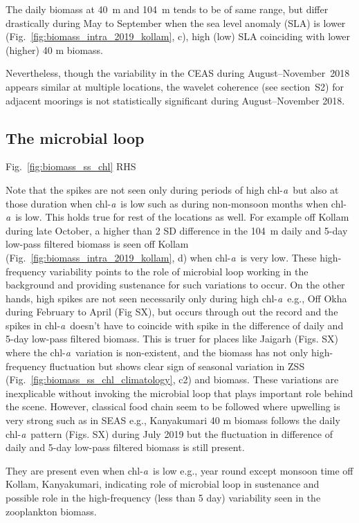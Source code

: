 \documentclass[authoryear,review,11pt]{elsarticle}
\newcommand{\chla}{chl-{\emph{a}}}
\begin{document}
The daily biomass at 40~m and 104~m tends to be of same range, but differ drastically during May to September when the sea level anomaly (SLA) is lower (Fig.~\ref{fig:biomass_intra_2019_kollam}, c),  high (low) SLA coinciding with lower (higher) 40 m biomass.   

 Nevertheless, though the variability in the CEAS during August--November~2018 appears similar at multiple locations, the wavelet coherence (see section~S2) for adjacent moorings is not statistically significant during August--November 2018.


\subsection{The microbial loop}
\label{sec:discuss.mloop}


Fig.~\ref{fig:biomass_ss_chl} RHS

Note that the spikes are not seen only during periods of high \chla\ but also at those duration when \chla\ is low such as during non-monsoon months when \chla\ is low. This holds true for rest of the locations as well. For example off Kollam during late October, a higher than 2 SD difference in the 104~m daily and 5-day low-pass filtered biomass is seen off Kollam (Fig.~\ref{fig:biomass_intra_2019_kollam}, d) when \chla\ is very low. These high-frequency variability points to the role of microbial loop working in the background and providing sustenance for such variations to occur. On the other hands, high spikes are not seen necessarily only during high \chla\ e.g., Off Okha during February to April (Fig SX), but occurs through out the record and the spikes in \chla\ doesn't have to coincide with spike in the difference of daily and 5-day low-pass filtered biomass. This is truer for places like Jaigarh (Figs. SX) where the \chla\ variation is non-existent, and the biomass has not only high-frequency fluctuation but shows clear sign of seasonal variation in ZSS (Fig.~\ref{fig:biomass_ss_chl_climatology}, c2) and biomass. These variations are inexplicable without invoking the microbial loop that plays important role behind the scene. However, classical food chain seem to be followed where upwelling is very strong such as in SEAS e.g., Kanyakumari 40 m biomass follows the daily \chla\ pattern (Figs. SX) during July 2019 but the fluctuation in difference of daily and 5-day low-pass filtered biomass is still present.

They are present even when \chla\ is low e.g., year round except monsoon time off Kollam, Kanyakumari, indicating role of microbial loop in sustenance and possible role in the high-frequency (less than 5 day) variability seen in the zooplankton biomass.
\end{document}
